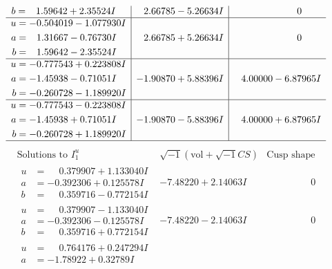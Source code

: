 \documentclass[1p]{elsarticle_modified}
\theoremstyle{definition}
\newcommand{\I}{\sqrt{-1}}
\begin{document}
$$\begin{array}{c|c|c}
\begin{aligned}
b &= \phantom{-}1.59642 + 2.35524 I\end{aligned}
 & \phantom{-}2.66785 - 5.26634 I & \phantom{-0.000000 } 0 \\ \hline\begin{aligned}
u &= -0.504019 - 1.077930 I \\
a &= \phantom{-}1.31667 - 0.76730 I \\
b &= \phantom{-}1.59642 - 2.35524 I\end{aligned}
 & \phantom{-}2.66785 + 5.26634 I & \phantom{-0.000000 } 0 \\ \hline\begin{aligned}
u &= -0.777543 + 0.223808 I \\
a &= -1.45938 - 0.71051 I \\
b &= -0.260728 - 1.189920 I\end{aligned}
 & -1.90870 + 5.88396 I & \phantom{-}4.00000 - 6.87965 I \\ \hline\begin{aligned}
u &= -0.777543 - 0.223808 I \\
a &= -1.45938 + 0.71051 I \\
b &= -0.260728 + 1.189920 I\end{aligned}
 & -1.90870 - 5.88396 I & \phantom{-}4.00000 + 6.87965 I\\
 \hline 
 \end{array}$$\newpage$$\begin{array}{c|c|c}  
\text{Solutions to }I^u_{1}& \I (\text{vol} + \sqrt{-1}CS) & \text{Cusp shape}\\
 \hline 
\begin{aligned}
u &= \phantom{-}0.379907 + 1.133040 I \\
a &= -0.392306 + 0.125578 I \\
b &= \phantom{-}0.359716 - 0.772154 I\end{aligned}
 & -7.48220 + 2.14063 I & \phantom{-0.000000 } 0 \\ \hline\begin{aligned}
u &= \phantom{-}0.379907 - 1.133040 I \\
a &= -0.392306 - 0.125578 I \\
b &= \phantom{-}0.359716 + 0.772154 I\end{aligned}
 & -7.48220 - 2.14063 I & \phantom{-0.000000 } 0 \\ \hline\begin{aligned}
u &= \phantom{-}0.764176 + 0.247294 I \\
a &= -1.78922 + 0.32789 I \\

\end{aligned}
\end{array}$$
\end{document}
